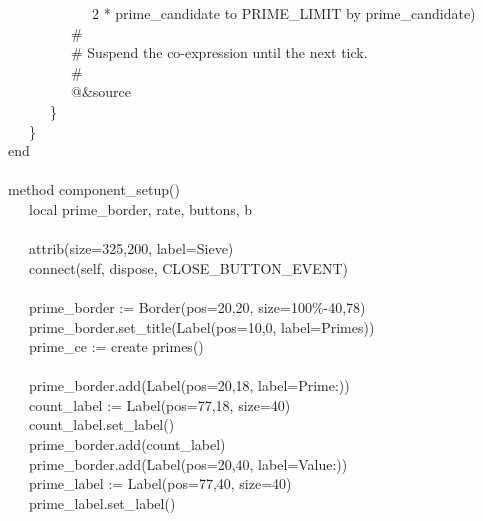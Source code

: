 {\>   \ \ \ \ \ \ \ \ \ \ \ \ 2 * prime\_candidate to PRIME\_LIMIT by prime\_candidate) \\
\>   \ \ \ \ \ \ \ \ \ \# \\
\>   \ \ \ \ \ \ \ \ \ \# Suspend the co-expression until the next
tick. \\
\>   \ \ \ \ \ \ \ \ \ \# \\
\>   \ \ \ \ \ \ \ \ \ @\&source \\
\>   \ \ \ \ \ \ \} \\
\>   \ \ \ \} \\
\>   end \\
\ \\
\>   method component\_setup() \\
\>   \ \ \ local prime\_border, rate, buttons, b \\
\ \\
\>   \ \ \ attrib({\textquotedbl}size=325,200{\textquotedbl},
{\textquotedbl}label=Sieve{\textquotedbl}) \\
\>   \ \ \ connect(self, {\textquotedbl}dispose{\textquotedbl},
CLOSE\_BUTTON\_EVENT) \\
\ \\
\>   \ \ \ prime\_border :=
Border({\textquotedbl}pos=20,20{\textquotedbl},
{\textquotedbl}size=100\%-40,78{\textquotedbl}) \\
\>   \ \ \ prime\_border.set\_title(Label({\textquotedbl}pos=10,0{\textquotedbl},
{\textquotedbl}label=Primes{\textquotedbl})) \\
\>   \ \ \ prime\_ce := create primes() \\
\ \\
\>   \ \ \ prime\_border.add(Label({\textquotedbl}pos=20,18{\textquotedbl},
{\textquotedbl}label=Prime:{\textquotedbl})) \\
\>   \ \ \ count\_label :=
Label({\textquotedbl}pos=77,18{\textquotedbl},
{\textquotedbl}size=40{\textquotedbl}) \\
\>   \ \ \ count\_label.set\_label({\textquotedbl}{\textquotedbl}) \\
\>   \ \ \ prime\_border.add(count\_label) \\
\>   \ \ \ prime\_border.add(Label({\textquotedbl}pos=20,40{\textquotedbl},
{\textquotedbl}label=Value:{\textquotedbl})) \\
\>   \ \ \ prime\_label :=
Label({\textquotedbl}pos=77,40{\textquotedbl},
{\textquotedbl}size=40{\textquotedbl}) \\
\>   \ \ \ prime\_label.set\_label({\textquotedbl}{\textquotedbl}) \\
}
